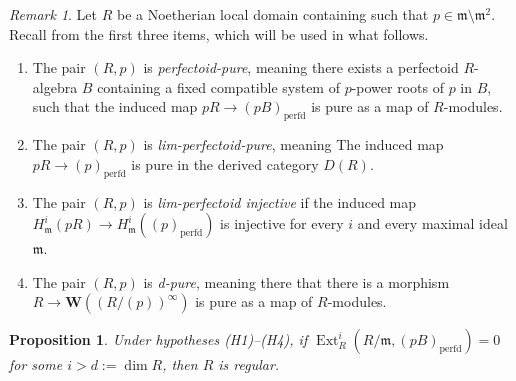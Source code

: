 \documentclass[12pt,reqno]{amsart}
\newtheorem{proposition}[theorem]{Proposition}
\theoremstyle{definition}
\theoremstyle{remark}
\newtheorem{remark}[theorem]{Remark}
\theoremstyle{cited}
\theoremstyle{remark}
\theoremstyle{citeddef}
\newcommand{\W}{\textbf{W}}
\begin{document}
	
	
	
	\begin{remark}
		Let $R$ be a Noetherian local domain containing   such that $p \in \mathfrak{m} \setminus \mathfrak{m}^2$. Recall from \cite{ket} the first three items, which will be used in what follows.
		\begin{enumerate}
			\item[(H1)] The pair $(R, p)$ is \textit{perfectoid-pure}, meaning there exists a perfectoid $R$-algebra $B$ containing a fixed compatible system of $p$-power roots of $p$ in $B$, such that the induced map
			\(
			pR \to (pB)_{\mathrm{perfd}}
			\)
			is pure as a map of $R$-modules.
			
			\item[(H2)]The pair $(R, p)$ is \textit{lim-perfectoid-pure}, meaning  The induced map
			\(
			pR \to (p)_{\mathrm{perfd}}
			\)
			is pure in the derived category $D(R)$.
			
			\item[(H3)] The pair $(R, p)$ is \textit{lim-perfectoid injective} if the induced map
			\( 
			H^i_{\mathfrak{m}}(pR) \to H^i_{\mathfrak{m}}((p)_{\mathrm{perfd}})
			\)
			is injective for every $i$ and every maximal ideal $\mathfrak{m}$.
			
			\item[(H4)] The pair $(R, p)$ is \textit{d-pure}, meaning there  that     there is a morphism
			\(
			R \to
			\W((R/(p))^\infty)\)
			is pure as a map of $R$-modules.
		\end{enumerate}    
	\end{remark}	
	
	\begin{proposition}
		\label{mainregularity}
		Under hypotheses (H1)--(H4), if
		\(
		\operatorname{Ext}_R^i(R/\mathfrak{m}, (pB)_{\mathrm{perfd}}) = 0
		\)
		for some $i > d := \dim R$, then $R$ is regular.   
	\end{proposition}
	
\end{document}
